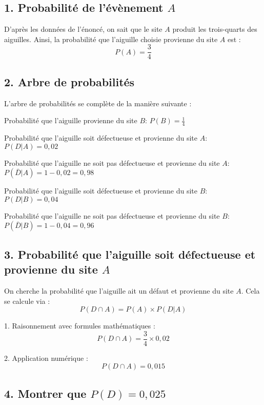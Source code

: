 \documentclass{exam}
\begin{document}
    \begin{solution}

\subsection*{1. Probabilité de l'évènement $A$}

D'après les données de l'énoncé, on sait que le site $A$ produit les trois-quarts des aiguilles. Ainsi, la probabilité que l'aiguille choisie provienne du site $A$ est :
\[
P(A) = \frac{3}{4}
\]

\subsection*{2. Arbre de probabilités}

L'arbre de probabilités se complète de la manière suivante :

\begin{compactitem}
   \item Probabilité que l'aiguille provienne du site $B$: \( P(B) = \frac{1}{4} \)
   \item Probabilité que l'aiguille soit défectueuse et provienne du site $A$: \( P(D|A) = 0,02 \)
   \item Probabilité que l'aiguille ne soit pas défectueuse et provienne du site $A$: \( P(\bar{D}|A) = 1 - 0,02 = 0,98 \)
   \item Probabilité que l'aiguille soit défectueuse et provienne du site $B$: \( P(D|B) = 0,04 \)
   \item Probabilité que l'aiguille ne soit pas défectueuse et provienne du site $B$: \( P(\bar{D}|B) = 1 - 0,04 = 0,96 \)
\end{compactitem}


\subsection*{3. Probabilité que l'aiguille soit défectueuse et provienne du site $A$}

On cherche la probabilité que l'aiguille ait un défaut et provienne du site $A$. Cela se calcule via :
\[
P(D \cap A) = P(A) \times P(D|A)
\]

1. Raisonnement avec formules mathématiques :
   \[
   P(D \cap A) = \frac{3}{4} \times 0,02
   \]

2. Application numérique :
   \[
   P(D \cap A) = 0,015
   \]

\subsection*{4. Montrer que $P(D) = 0,025$}


\end{solution}
\end{document}
